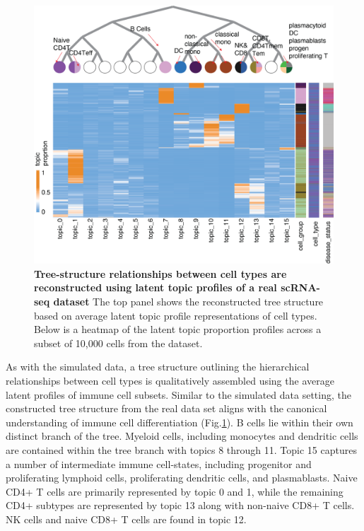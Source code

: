 \begin{figure}
    \centering
    \includegraphics[width=\textwidth]{Figures/hier_tree.png}
    \caption{\textbf{Tree-structure relationships between cell types are reconstructed using latent topic profiles of a real scRNA-seq dataset} The top panel shows the reconstructed tree structure based on average latent topic profile representations of cell types. Below is a heatmap of the latent topic proportion profiles across a subset of 10,000 cells from the dataset.}
    \label{fig:sle_tree}
\end{figure}

As with the simulated data, a tree structure outlining the hierarchical relationships between cell types is qualitatively assembled using the average latent profiles of immune cell subsets. Similar to the simulated data setting, the constructed tree structure from the real data set aligns with the canonical understanding of immune cell differentiation (Fig.\ref{fig:sle_tree}). B cells lie within their own distinct branch of the tree. Myeloid cells, including monocytes and dendritic cells are contained within the tree branch with topics 8 through 11. Topic 15 captures a number of intermediate immune cell-states, including progenitor and proliferating lymphoid cells, proliferating dendritic cells, and plasmablasts. Naive CD4+ T cells are primarily represented by topic 0 and 1, while the remaining CD4+ subtypes are represented by topic 13 along with non-naive CD8+ T cells. NK cells and naive CD8+ T cells are found in topic 12. 


